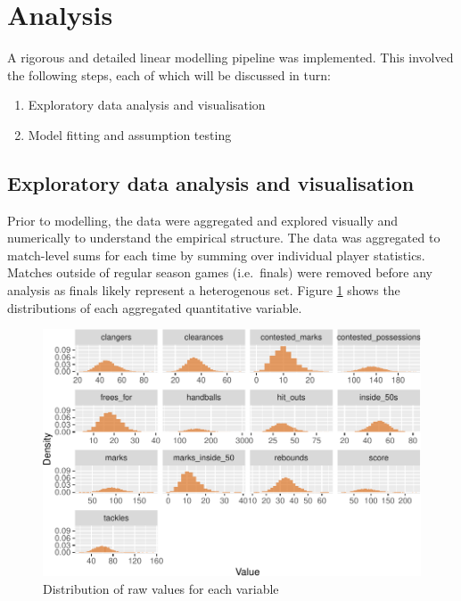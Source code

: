 \documentclass{article}
\begin{document}
\hypertarget{analysis}{%
\section{Analysis}\label{analysis}}

A rigorous and detailed linear modelling pipeline was implemented. This involved the following steps, each of which will be discussed in turn:

\begin{enumerate}
\def\labelenumi{\arabic{enumi}.}
\tightlist
\item
  Exploratory data analysis and visualisation
\item
  Model fitting and assumption testing
\end{enumerate}

\hypertarget{exploratory-data-analysis-and-visualisation}{%
\subsection{Exploratory data analysis and visualisation}\label{exploratory-data-analysis-and-visualisation}}

Prior to modelling, the data were aggregated and explored visually and numerically to understand the empirical structure. The data was aggregated to match-level sums for each time by summing over individual player statistics. Matches outside of regular season games (i.e.~finals) were removed before any analysis as finals likely represent a heterogenous set. Figure \ref{fig:distplot} shows the distributions of each aggregated quantitative variable.

\begin{figure}
\centering
\includegraphics{OLET5608_TrentHenderson_files/figure-latex/distplot-1.pdf}
\caption{\label{fig:distplot}Distribution of raw values for each variable}
\end{figure}
\end{document}
